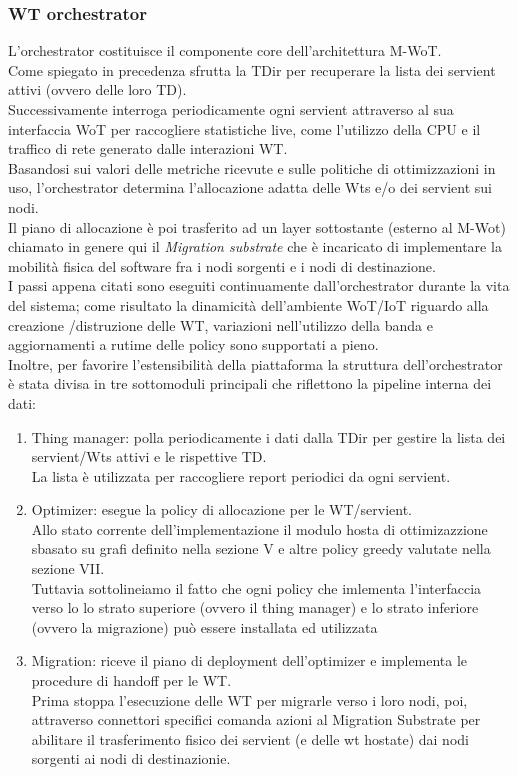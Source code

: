 \documentclass[11pt]{article}
\begin{document}
		\subsubsection{WT orchestrator}
		L'orchestrator costituisce il componente core dell'architettura M-WoT. \\
		Come spiegato in precedenza sfrutta la TDir per recuperare la lista dei servient attivi (ovvero delle loro TD).\\
		Successivamente interroga periodicamente ogni servient attraverso al sua interfaccia WoT per raccogliere statistiche live, come l'utilizzo della CPU e il traffico di rete generato dalle interazioni WT. \\
		Basandosi sui valori delle metriche ricevute e sulle politiche di ottimizzazioni in uso, l'orchestrator determina l'allocazione adatta delle Wts e/o dei servient sui nodi. \\
		Il piano di allocazione è poi trasferito ad un layer sottostante (esterno al M-Wot) chiamato in genere qui il \textit{Migration substrate} che è incaricato di implementare la mobilità fisica del software fra i nodi sorgenti e i nodi di destinazione. \\
		I passi appena citati sono eseguiti continuamente dall'orchestrator durante la vita del sistema; come risultato la dinamicità dell'ambiente WoT/IoT riguardo alla creazione /distruzione delle WT, variazioni nell'utilizzo della banda e aggiornamenti a rutime delle policy sono supportati a pieno. \\
		Inoltre, per favorire l'estensibilità della piattaforma la struttura dell'orchestrator è stata divisa in tre sottomoduli principali che riflettono la pipeline interna dei dati:
		\begin{enumerate}
			\item Thing manager: polla periodicamente i dati dalla TDir per gestire la lista dei servient/Wts attivi e le rispettive TD. \\
			La lista è utilizzata per raccogliere report periodici da ogni servient.
			\item Optimizer: esegue la policy di allocazione per le WT/servient. \\
			Allo stato corrente dell'implementazione il modulo hosta  di ottimizazzione sbasato su grafi definito nella sezione V e altre policy greedy valutate nella sezione VII.\\
			Tuttavia sottolineiamo il fatto che ogni policy che imlementa l'interfaccia verso lo lo strato superiore (ovvero il thing manager) e lo strato inferiore (ovvero la migrazione)  può essere installata ed utilizzata
			\item Migration: riceve il piano di deployment dell'optimizer e implementa le procedure di handoff per le WT. \\
			Prima stoppa l'esecuzione delle WT per migrarle verso i loro nodi, poi, attraverso connettori specifici comanda azioni al Migration Substrate per abilitare il trasferimento fisico dei servient (e delle wt hostate) dai nodi sorgenti ai nodi di destinazionie.
		\end{enumerate}
\end{document}
